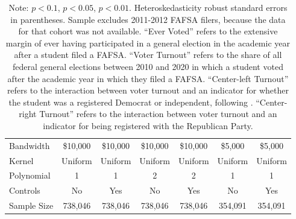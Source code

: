 \documentclass[12pt,letterpaper,oneside]{book}
\begin{document}
\begin{table}[h!]
\begin{tabular}{l*{6}{c}}
        \hline
        Bandwidth & \$10,000       &   \$10,000        &   \$10,000        &   \$10,000       &   \$5,000        &   \$5,000        \\
        Kernel&   Uniform      &   Uniform        &   Uniform        &   Uniform       &   Uniform       &   Uniform       \\
        Polynomial&   1       &   1        &   2        &   2       &   1       &   1       \\
        Controls&   No       &   Yes        &   No        &   Yes        &   No        &   Yes        \\
        Sample Size      &   738,046     &    738,046      &      738,046      &   738,046    &   354,091       &   354,091        \\
        \hline
    \end{tabular}
    \caption*{\footnotesize Note: \sym{+} \(p<0.1\), \sym{*} \(p<0.05\), \sym{**} \(p<0.01\). Heteroskedasticity robust standard errors in parentheses. Sample excludes 2011-2012 FAFSA filers, because the data for that cohort was not available. ``Ever Voted'' refers to the extensive margin of ever having participated in a general election in the academic year after a student filed a FAFSA. ``Voter Turnout'' refers to the share of all federal general elections between 2010 and 2020 in which a student voted after the academic year in which they filed a FAFSA. ``Center-left Turnout'' refers to the interaction between voter turnout and an indicator for whether the student was a registered Democrat or independent, following \cite{firoozi_effect_2023}.  ``Center-right Turnout'' refers to the interaction between voter turnout and an indicator for being registered with the Republican Party.}
\end{table}

\clearpage
\end{document}
